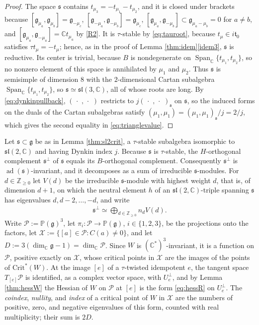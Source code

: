 \documentclass[leqno,10pt]{amsart}
\theoremstyle{definition}
\numberwithin{equation}{section}
\newcommand{\dum}{\,\cdot\,\,}
\newcommand{\integer}{\mathbb{Z}}
\newcommand{\spn}{\operatorname{Span}}
\newcommand{\sll}{\mathfrak{sl}}
\newcommand{\proj}{\mathbb{P}}
\newcommand{\g}{\mathfrak{g}}
\newcommand{\ad}{\operatorname{ad}}
\newcommand{\com}{\mathbb C}
\newcommand{\crtnt}{\mathrm{Crit}^*}
\newcommand{\subs}{\mathfrak{s}}
\newcommand{\Usp}{U}
\newcommand{\Uperp}{\Usp^{\perp}}
\begin{document}
\begin{proof}
The space $\subs$ contains $t_{\mu_{3}} = -t_{\mu_{1}} - t_{\mu_{2}}$, and it is closed under brackets because $[\g_{\mu_{a}}, \g_{\mu_{b}}] = \g_{-\mu_{c}}$, $[\g_{-\mu_{a}}, \g_{-\mu_{b}}] = \g_{\mu_{c}}$, $[\g_{\mu_{a}}, \g_{-\mu_{b}}] \subset \g_{\mu_{a} - \mu_{b}} = 0$ for $a \neq b$, and $[\g_{\mu_{a}}, \g_{-\mu_{a}}] = \com t_{\mu_{a}}$ by \ref{R2}. It is $\tau$-stable by \eqref{eq:tauroot}, because $t_{\mu} \in i\mathfrak{t}_{0}$ satisfies $\tau t_{\mu} = -t_{\mu}$; hence, as in the proof of Lemma \ref{thm:idem}\ref{idem3}, $\subs$ is reductive. Its center is trivial, because $B$ is nondegenerate on $\spn_{\com}\{t_{\mu_{1}}, t_{\mu_{2}}\}$, so no nonzero element of this space is annihilated by $\mu_{1}$ and $\mu_{2}$. Thus $\subs$ is semisimple of dimension $8$ with the $2$-dimensional Cartan subalgebra $\spn_{\com}\{t_{\mu_{1}}, t_{\mu_{2}}\}$, so $\subs \simeq \sll(3, \com)$, all of whose roots are long. By \eqref{eq:dynkinpullback}, $(\dum, \dum)$ restricts to $j(\dum, \dum)_{\subs}$ on $\subs$, so the induced forms on the duals of the Cartan subalgebras satisfy $(\mu_{1}, \mu_{1}) = (\mu_{1}, \mu_{1})_{\subs}/j = 2/j$, which gives the second equality in \eqref{eq:trianglevalue}.
\end{proof}

Let $\subs\subset \g$ be as in Lemma \ref{thm:sl2crit}, a $\tau$-stable subalgebra isomorphic to $\sll(2, \com)$ and having Dynkin index $j$. Because $\subs$ is $\tau$-stable, the $H$-orthogonal complement $\subs^{\perp}$ of $\subs$ equals its $B$-orthogonal complement. Consequently $\subs^{\perp}$ is $\ad(\subs)$-invariant, and it decomposes as a sum of irreducible $\subs$-modules. For $d \in \integer_{\geq 0}$ let $V(d)$ be the irreducible $\subs$-module with highest weight $d$, that is, of dimension $d+1$, on which the neutral element $h$ of an $\sll(2, \com)$-triple spanning $\subs$ has eigenvalues $d, d-2, \dots, -d$, and write
\begin{align}\label{eq:sperpdecomp}
\subs^{\perp} \simeq \bigoplus_{d \in \integer_{\geq 0}}n_{d}V(d).
\end{align}
Write $\mathcal{P} := \proj(\g)^{3}$, let $\pi_{i}:\mathcal{P} \to \proj(\g)$, $i \in \{1, 2, 3\}$, be the projections onto the factors, let $\mathcal{X} := \{[a] \in \mathcal{P}: C(a) \neq 0\}$, and let $D := 3(\dim_{\com}\g - 1) = \dim_{\com}\mathcal{P}$. Since $W$ is $(\com^{\ast})^{3}$-invariant, it is a function on $\mathcal{P}$, positive exactly on $\mathcal{X}$, whose critical points in $\mathcal{X}$ are the images of the points of $\crtnt(W)$. At the image $[e]$ of a $\tau$-twisted idempotent $e$, the tangent space $T_{[e]}\mathcal{P}$ is identified, as a complex vector space, with $\Uperp_{e}$, and by Lemma \ref{thm:hessW} the Hessian of $W$ on $\mathcal{P}$ at $[e]$ is the form \eqref{eq:hessR} on $\Uperp_{e}$. The \emph{coindex}, \emph{nullity}, and \emph{index} of a critical point of $W$ in $\mathcal{X}$ are the numbers of positive, zero, and negative eigenvalues of this form, counted with real multiplicity; their sum is $2D$.
\end{document}
